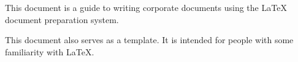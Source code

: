This document is a guide to writing corporate documents using the LaTeX document preparation system.

This document also serves as a template. It is intended for people with some familiarity with LaTeX.